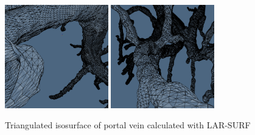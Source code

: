 \documentclass[11pt, oneside]{amsart}   	%
\begin{document}
\begin{figure}
\centering
\includegraphics[width=0.4\textwidth]{figs/porta_smoothing_1.png} 
\vspace{0.05\textwidth}
\includegraphics[width=0.4\textwidth]{figs/porta_smoothing_2.png} 
\caption{Triangulated isosurface of portal vein calculated with LAR-SURF}
\label{fig:example_porta}
\end{figure}
\end{document}

